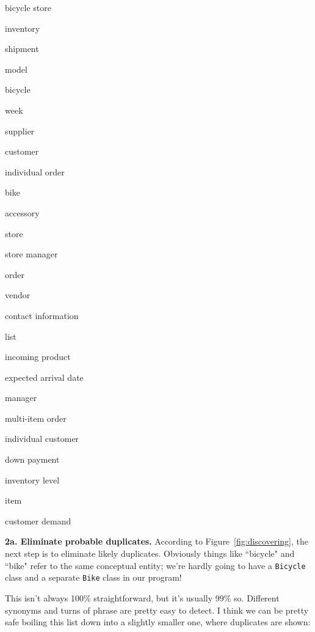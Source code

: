 \begin{samepage}
\begin{multicols}{3}
\small
\begin{compactitem}
\renewcommand\labelitemi{\raisebox{0.25ex}{\tiny$\bullet$}}
\item \textsf{bicycle store}
\item \textsf{inventory}
\item \textsf{shipment}
\item \textsf{model}
\item \textsf{bicycle}
\item \textsf{week}
\item \textsf{supplier}
\item \textsf{customer}
\item \textsf{individual order}
\columnbreak
\item \textsf{bike}
\item \textsf{accessory}
\item \textsf{store}
\item \textsf{store manager}
\item \textsf{order}
\item \textsf{vendor}
\item \textsf{contact information}
\item \textsf{list}
\item \textsf{incoming product}
\columnbreak
\item \textsf{expected arrival date}
\item \textsf{manager}
\item \textsf{multi-item order}
\item \textsf{individual customer}
\item \textsf{down payment}
\item \textsf{inventory level}
\item \textsf{item}
\item \textsf{customer demand}
\end{compactitem}
\end{multicols}
\end{samepage}

\textbf{2a. Eliminate probable duplicates.} According to
Figure~\ref{fig:discovering}, the next step is to eliminate likely duplicates.
Obviously things like ``bicycle" and ``bike" refer to the same conceptual
entity; we're hardly going to have a \texttt{Bicycle} class and a separate
\texttt{Bike} class in our program!

This isn't always 100\% straightforward, but it's usually 99\% so. Different
synonyms and turns of phrase are pretty easy to detect. I think we can be
pretty safe boiling this list down into a slightly smaller one, where
duplicates are shown:

